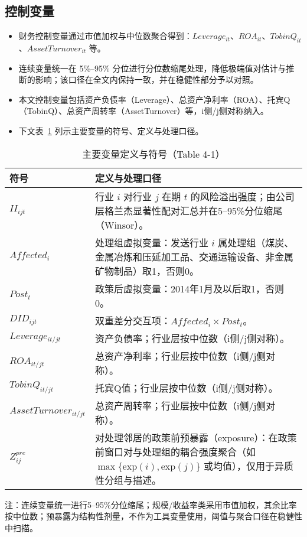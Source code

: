 \subsection{控制变量}
\begin{itemize}
    \item 财务控制变量通过市值加权与中位数聚合得到：$Leverage_{it}$、$ROA_{it}$、$TobinQ_{it}$、$AssetTurnover_{it}$ 等。
    \item 连续变量统一在 5\%--95\% 分位进行分位数缩尾处理，降低极端值对估计与推断的影响；该口径在全文内保持一致，并在稳健性部分予以对照。
    \item 本文控制变量包括资产负债率（Leverage）、总资产净利率（ROA）、托宾Q（TobinQ）、总资产周转率（AssetTurnover）等，i侧/j侧对称纳入。
    \item 下文表~\ref{tab:variables_4_1} 列示主要变量的符号、定义与处理口径。
\end{itemize}

\begin{table}[htbp]
\centering
\caption{主要变量定义与符号（Table 4-1）}
\label{tab:variables_4_1}
\begin{threeparttable}
\small
\begin{tabular}{lp{10.5cm}}
\toprule
\textbf{符号} & \textbf{定义与处理口径} \\
\midrule
$II_{ijt}$ & 行业 $i$ 对行业 $j$ 在期 $t$ 的风险溢出强度；由公司层格兰杰显著性配对汇总并在5--95\%分位缩尾（Winsor）。\\
$Affected_i$ & 处理组虚拟变量：发送行业 $i$ 属处理组（煤炭、金属冶炼和压延加工品、交通运输设备、非金属矿物制品）取1，否则0。\\
$Post_t$ & 政策后虚拟变量：2014年1月及以后取1，否则0。\\
$DID_{ijt}$ & 双重差分交互项：$Affected_i\times Post_t$。\\
$Leverage_{it/jt}$ & 资产负债率；行业层按中位数（i侧/j侧对称）。\\
$ROA_{it/jt}$ & 总资产净利率；行业层按中位数（i侧/j侧对称）。\\
$TobinQ_{it/jt}$ & 托宾Q值；行业层按中位数（i侧/j侧对称）。\\
$AssetTurnover_{it/jt}$ & 总资产周转率；行业层按中位数（i侧/j侧对称）。\\
$Z^{pre}_{ij}$ & 对处理邻居的政策前预暴露（exposure）：在政策前窗口对与处理组的耦合强度聚合（如 $\max\{\text{exp}(i),\text{exp}(j)\}$ 或均值），仅用于异质性分组与描述。\\
\bottomrule
\end{tabular}
\begin{tablenotes}
\footnotesize
\item 注：连续变量统一进行5--95\%分位缩尾；规模/收益率类采用市值加权，其余比率按中位数；预暴露为结构性剂量，不作为工具变量使用，阈值与聚合口径在稳健性中扫描。
\end{tablenotes}
\end{threeparttable}
\end{table}

